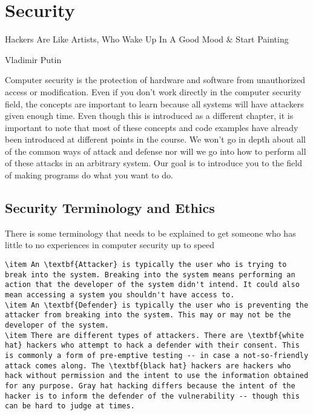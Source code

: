 \chapter{Security}

\epigraph{Hackers Are Like Artists, Who Wake Up In A Good Mood \& Start Painting}{Vladimir Putin}

Computer security is the protection of hardware and software from unauthorized access or modification.
Even if you don't work directly in the computer security field, the concepts are important to learn because all systems will have attackers given enough time.
Even though this is introduced as a different chapter, it is important to note that most of these concepts and code examples have already been introduced at different points in the course.
We won't go in depth about all of the common ways of attack and defense nor will we go into how to perform all of these attacks in an arbitrary system.
Our goal is to introduce you to the field of making programs do what you want to do.

\section{Security Terminology and Ethics}

There is some terminology that needs to be explained to get someone who has little to no experiences in computer security up to speed

\begin{lstlisting}
\item An \textbf{Attacker} is typically the user who is trying to break into the system. Breaking into the system means performing an action that the developer of the system didn't intend. It could also mean accessing a system you shouldn't have access to.
\item An \textbf{Defender} is typically the user who is preventing the attacker from breaking into the system. This may or may not be the developer of the system.
\item There are different types of attackers. There are \textbf{white hat} hackers who attempt to hack a defender with their consent. This is commonly a form of pre-emptive testing -- in case a not-so-friendly attack comes along. The \textbf{black hat} hackers are hackers who hack without permission and the intent to use the information obtained for any purpose. Gray hat hacking differs because the intent of the hacker is to inform the defender of the vulnerability -- though this can be hard to judge at times.
\end{lstlisting}

